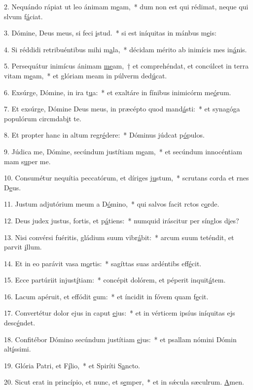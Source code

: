 2. Nequándo rápiat ut leo ánimam m\uline{e}am,~* dum non est qui rédimat, neque qui slvum f\uline{á}ciat.\par 
3. Dómine, Deus meus, si feci \uline{i}stud.~* si est iníquitas in mánbus m\uline{e}is:\par 
4. Si réddidi retribuéntibus mihi m\uline{a}la,~* décidam mérito ab inimícis mes in\uline{á}nis.\par 
5. Persequátur inimícus ánimam \uline{me}am,~† et comprehéndat, et concúlcet in terra vitam m\uline{e}am,~* et glóriam meam in púlverm ded\uline{ú}cat.\par 
6. Exsúrge, Dómine, in ira t\uline{u}a:~* et exaltáre in fínibus inimicórm me\uline{ó}rum.\par 
7. Et exsúrge, Dómine Deus meus, in præcépto quod mand\uline{á}sti:~* et synagóga populórum circmdab\uline{i}t te.\par 
8. Et propter hanc in altum regr\uline{é}dere:~* Dóminus júdcat p\uline{ó}pulos.\par 
9. Júdica me, Dómine, secúndum justítiam m\uline{e}am,~* et secúndum innocéntiam mam s\uline{u}per me.\par 
10. Consumétur nequítia peccatórum, et díriges j\uline{u}stum,~* scrutans corda et rnes D\uline{e}us.\par 
11. Justum adjutórium meum a D\uline{ó}mino,~* qui salvos facit rctos c\uline{o}rde.\par 
12. Deus judex justus, fortis, et p\uline{á}tiens:~* numquid iráscitur per sínglos d\uline{i}es?\par 
13. Nisi convérsi fuéritis, gládium suum vibr\uline{á}bit:~* arcum suum teténdit, et parvit \uline{i}llum.\par 
14. Et in eo parávit vasa m\uline{o}rtis:~* sagíttas suas ardéntibs eff\uline{é}cit.\par 
15. Ecce partúriit injust\uline{í}tiam:~* concépit dolórem, et péperit inquit\uline{á}tem.\par 
16. Lacum apéruit, et effódit \uline{e}um:~* et íncidit in fóvem quam f\uline{e}cit.\par 
17. Convertétur dolor ejus in caput \uline{e}jus:~* et in vérticem ipsíus iníquitas ejs desc\uline{é}ndet.\par 
18. Confitébor Dómino secúndum justítiam \uline{e}jus:~* et psallam nómini Dómin alt\uline{í}ssimi.\par 
19. Glória Patri, et F\uline{í}lio,~* et Spiríti S\uline{a}ncto.\par 
20. Sicut erat in princípio, et nunc, et s\uline{e}mper,~* et in sǽcula sæculrum. \uline{A}men.\par 
